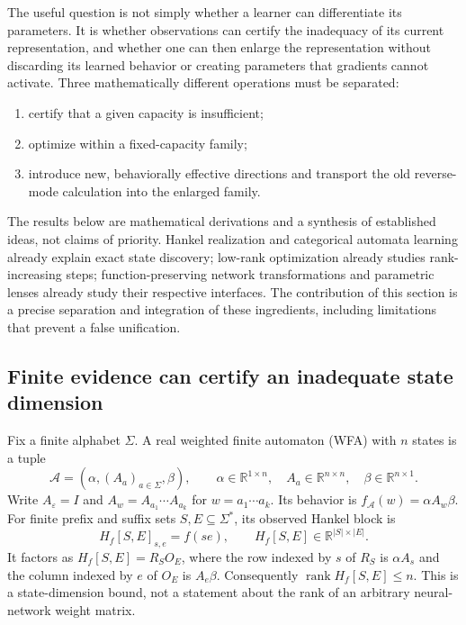 \documentclass[11pt]{article}
\theoremstyle{definition}
\theoremstyle{remark}
\begin{document}
The useful question is not simply whether a learner can differentiate its
parameters. It is whether observations can certify the inadequacy of its
current representation, and whether one can then enlarge the representation
without discarding its learned behavior or creating parameters that gradients
cannot activate. Three mathematically different operations must be separated:
\begin{enumerate}
\item certify that a given capacity is insufficient;
\item optimize within a fixed-capacity family;
\item introduce new, behaviorally effective directions and transport the old
      reverse-mode calculation into the enlarged family.
\end{enumerate}
The results below are mathematical derivations and a synthesis of established
ideas, not claims of priority. Hankel realization and categorical automata
learning already explain exact state discovery; low-rank optimization already
studies rank-increasing steps; function-preserving network transformations and
parametric lenses already study their respective interfaces. The contribution
of this section is a precise separation and integration of these ingredients,
including limitations that prevent a false unification.

\subsection{Finite evidence can certify an inadequate state dimension}

Fix a finite alphabet $\Sigma$. A real weighted finite automaton (WFA) with
$n$ states is a tuple
\[
 \mathcal A=(\alpha,(A_a)_{a\in\Sigma},\beta),\qquad
 \alpha\in\mathbb R^{1\times n},\quad A_a\in\mathbb R^{n\times n},
 \quad\beta\in\mathbb R^{n\times1}.
\]
Write $A_\varepsilon=I$ and $A_w=A_{a_1}\cdots A_{a_k}$ for
$w=a_1\cdots a_k$. Its behavior is $f_{\mathcal A}(w)=\alpha A_w\beta$.
For finite prefix and suffix sets $S,E\subseteq\Sigma^*$, its observed
Hankel block is
\[
 H_f[S,E]_{s,e}=f(se),\qquad H_f[S,E]\in\mathbb R^{|S|\times|E|}.
\]
It factors as $H_f[S,E]=R_SO_E$, where the row indexed by $s$ of $R_S$
is $\alpha A_s$ and the column indexed by $e$ of $O_E$ is $A_e\beta$.
Consequently $\operatorname{rank}H_f[S,E]\leq n$. This is a state-dimension
bound, not a statement about the rank of an arbitrary neural-network weight
matrix.
\end{document}
